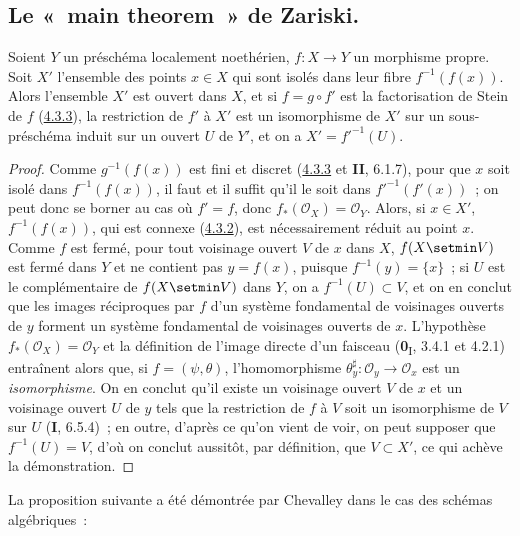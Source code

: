 \subsection{Le «~main theorem~» de Zariski.}
\label{subsection:III.4.4-fr}

\begin{proposition}[4.4.1]
\label{III.4.4.1-fr}
Soient $Y$ un préschéma localement noethérien, $f:X\to Y$ un morphisme
propre. Soit $X'$ l'ensemble des points $x\in X$ qui sont isolés dans leur
fibre $f^{-1}(f(x))$. Alors l'ensemble $X'$ est ouvert dans $X$, et si
$f=g\circ f'$ est la factorisation de Stein de $f$
\textup{(\hyperref[III.4.3.3-fr]{4.3.3})}, la restriction de $f'$ à $X'$ est un
isomorphisme de $X'$ sur un sous-préschéma induit sur un ouvert $U$ de $Y'$,
et on a $X'=f'^{-1}(U)$.
\end{proposition}

\begin{proof}
Comme $g^{-1}(f(x))$ est fini et discret
(\hyperref[III.4.3.3-fr]{4.3.3} et \textbf{II}, 6.1.7), pour que $x$ soit isolé dans
$f^{-1}(f(x))$, il faut et il suffit qu'il le soit dans
$f'^{-1}(f'(x))$~; on peut donc se borner au cas où $f'=f$, donc
$f_*(\mathcal O_X)=\mathcal O_Y$. Alors, si $x\in X'$,
$f^{-1}(f(x))$, qui est connexe (\hyperref[III.4.3.2-fr]{4.3.2}), est
nécessairement réduit au point $x$. Comme $f$ est fermé, pour tout voisinage
ouvert $V$ de $x$ dans $X$, $f(X\setmin V)$ est fermé dans $Y$ et ne contient pas
$y=f(x)$, puisque $f^{-1}(y)=\{x\}$~; si $U$ est le complémentaire de
$f(X\setmin V)$ dans $Y$, on a $f^{-1}(U)\subset V$, et on en conclut que les
images réciproques par $f$ d'un système fondamental de voisinages ouverts de
$y$ forment un système fondamental de voisinages ouverts de $x$. L'hypothèse
$f_*(\mathcal O_X)=\mathcal O_Y$ et la définition de l'image directe d'un
faisceau (\textbf{0}\textsubscript{I}, 3.4.1 et 4.2.1) entraînent alors que, si
$f=(\psi,\theta)$, l'homomorphisme
$\theta_y^\sharp:\mathcal O_y\to\mathcal O_x$ est un \emph{isomorphisme}. On en conclut
qu'il existe un voisinage ouvert $V$ de $x$ et un voisinage ouvert $U$ de
$y$ tels que la restriction de $f$ à $V$ soit un isomorphisme de $V$ sur
$U$ (\textbf{I}, 6.5.4)~; en outre, d'après ce qu'on vient de voir,
on peut supposer que $f^{-1}(U)=V$, d'où on conclut aussitôt, par définition,
que $V\subset X'$, ce qui achève la démonstration.
\end{proof}

La proposition suivante a été démontrée par Chevalley dans le cas des schémas
algébriques~:

